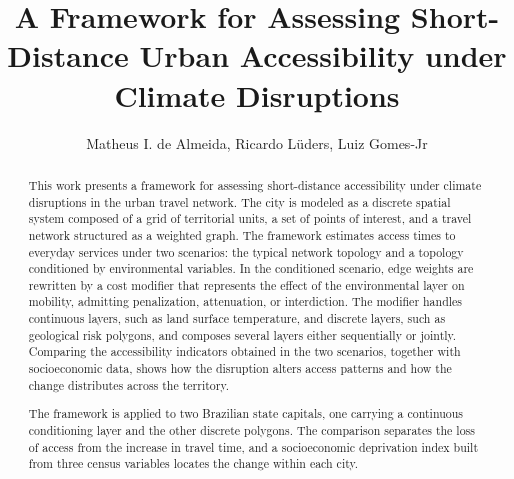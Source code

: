 \documentclass[12pt]{article}
\title{A Framework for Assessing Short-Distance Urban Accessibility under Climate Disruptions}
\author{Matheus I. de Almeida\inst{1}, Ricardo Lüders\inst{1}, Luiz Gomes-Jr\inst{1}}
\begin{document}
 

\maketitle

\begin{abstract}
This work presents a framework for assessing short-distance accessibility under climate disruptions in the urban travel network. The city is modeled as a discrete spatial system composed of a grid of territorial units, a set of points of interest, and a travel network structured as a weighted graph. The framework estimates access times to everyday services under two scenarios: the typical network topology and a topology conditioned by environmental variables. In the conditioned scenario, edge weights are rewritten by a cost modifier that represents the effect of the environmental layer on mobility, admitting penalization, attenuation, or interdiction. The modifier handles continuous layers, such as land surface temperature, and discrete layers, such as geological risk polygons, and composes several layers either sequentially or jointly. Comparing the accessibility indicators obtained in the two scenarios, together with socioeconomic data, shows how the disruption alters access patterns and how the change distributes across the territory.

The framework is applied to two Brazilian state capitals, one carrying a continuous conditioning layer and the other discrete polygons. The comparison separates the loss of access from the increase in travel time, and a socioeconomic deprivation index built from three census variables locates the change within each city.
\end{abstract}
     
\end{document}
